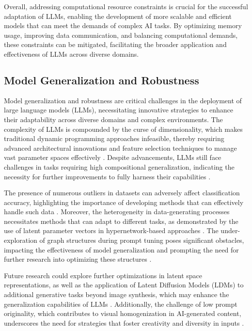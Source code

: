 Overall, addressing computational resource constraints is crucial for the successful adaptation of LLMs, enabling the development of more scalable and efficient models that can meet the demands of complex AI tasks. By optimizing memory usage, improving data communication, and balancing computational demands, these constraints can be mitigated, facilitating the broader application and effectiveness of LLMs across diverse domains.


\subsection{Model Generalization and Robustness} \label{subsec:Model Generalization and Robustness}



Model generalization and robustness are critical challenges in the deployment of large language models (LLMs), necessitating innovative strategies to enhance their adaptability across diverse domains and complex environments. The complexity of LLMs is compounded by the curse of dimensionality, which makes traditional dynamic programming approaches infeasible, thereby requiring advanced architectural innovations and feature selection techniques to manage vast parameter spaces effectively \cite{le2019evolvingselfsupervisedneuralnetworks}. Despite advancements, LLMs still face challenges in tasks requiring high compositional generalization, indicating the necessity for further improvements to fully harness their capabilities \cite{chitale2023taskarithmeticloracontinual}.



The presence of numerous outliers in datasets can adversely affect classification accuracy, highlighting the importance of developing methods that can effectively handle such data \cite{goldfarb2022analysiscatastrophicforgettingrandom}. Moreover, the heterogeneity in data-generating processes necessitates methods that can adapt to different tasks, as demonstrated by the use of latent parameter vectors in hypernetwork-based approaches \cite{wang2023environmenttransformerpolicyoptimization}. The under-exploration of graph structures during prompt tuning poses significant obstacles, impacting the effectiveness of model generalization and prompting the need for further research into optimizing these structures \cite{ge2024psppretrainingstructureprompt}.



Future research could explore further optimizations in latent space representations, as well as the application of Latent Diffusion Models (LDMs) to additional generative tasks beyond image synthesis, which may enhance the generalization capabilities of LLMs \cite{rombach2022high}. Additionally, the challenge of low prompt originality, which contributes to visual homogenization in AI-generated content, underscores the need for strategies that foster creativity and diversity in inputs \cite{bogoychev2020domaintranslationesenoisesynthetic}. 



